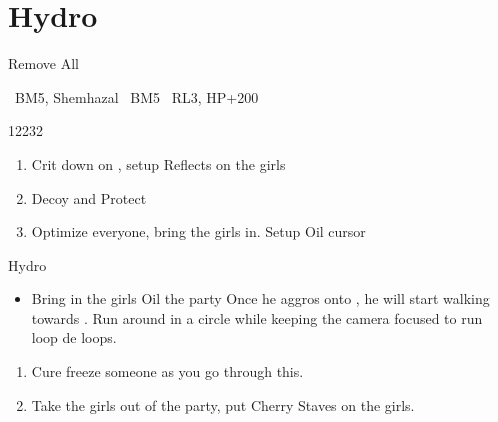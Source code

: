 \chapter{Hydro}

\begin{equip}
	Remove All
\end{equip}
\begin{liscense}
	\ashe\ BM5, Shemhazal
	\penelo\ BM5
	\vaan\ RL3, HP+200
\end{liscense}
\begin{shop}{12232}
\end{shop}
\begin{enumerate}
	\item Crit down on \penelo, setup Reflects on the girls
	\item Decoy and Protect \vaan
	\item Optimize everyone, bring the girls in. Setup Oil cursor
\end{enumerate}
\begin{gambit}
	\begin{itemize}
	\end{itemize}
\end{gambit}
\begin{battle}{Hydro}
	\begin{itemize}
		\item Bring in the girls
		      \penelof Oil the party
		      \vaanf Once he aggros onto \vaan, he will start walking towards \vaan. Run around in a circle while keeping the camera focused to run loop de loops.
	\end{itemize}
\end{battle}
\begin{enumerate}
	\item Cure freeze someone as you go through this.
	\item Take the girls out of the party, put Cherry Staves on the girls.
\end{enumerate}